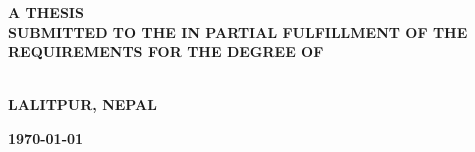 \begin{titlepage}
\begin{center}
\begin{minipage}[t]{0.8\textwidth}
\normalsize
{} %
\end{minipage}

\vspace{1cm} 

\normalsize \MakeUppercase{\bfseries A thesis\\ submitted to the \deptname \hspace{0in} in partial fulfillment of the requirements for the degree of \\{\degreename}}

\vspace{1cm}
\normalsize \MakeUppercase{\bfseries\deptname \\Lalitpur, Nepal}\\

\vspace{0.5cm}

\vfill
{\normalsize \bfseries \mydate\today} %



\end{center}
\end{titlepage}